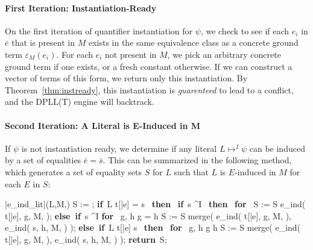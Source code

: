 \documentclass{llncs}
\def\IF{\qtab\keyword{if}\ }
\def\THEN{\ \keyword{then}\ }
\def\ELSEIF{\untab\qtab\keyword{else if}\ }
\def\FI{\untab}
\def\RETURN{\keyword{return}\ }
\def\ENDPROC{\untab}
\def\DOFOR{\qtab\keyword{for}\ }
\def\ENDFOR{\untab}
\def\keyword#1{\mbox{\normalshape\bf #1}}
\begin{document}
\begin{comment}
On the first iteration, we return the instantiation $\varepsilon_M( \bar{e} )$ if and only if $\psi$ is instantiation-ready.
On the second iteration, we determine if there exists a set of terms $\bar{s}$ such that we can determine that at least one of $L_1[\bar{e}] \ldots L_n[\bar{e}]$ is $(\bar{s} = \bar{e})$-induced in $M$.
On the third iteration, we will search for equality-ambiguous pairs of terms $t[\bar{e}]$ and $s$ in the same equivalence classes.  
Specifically, we will construct an instantiation $\bar{s}$ such that an equality between a subterm position of $t[\bar{e}]$ and $s$ is induced by $\bar{s} = \bar{e}$ on this step.
On the fourth iteration, we find a set of terms $\bar{s}$ that induce at least one equality between a pair of terms $t[\bar{e}]$ and $g$.
Note that this step is roughly equivalent to basic E-matching.
\end{comment}

\paragraph{First Iteration: Instantiation-Ready}

On the first iteration of quantifier instantiation for $\psi$, we check to see if each $e_i$ in $\bar{e}$ that is present in $M$ exists in the same equivalence class as a concrete ground term $\varepsilon_M(e_i)$.
For each $e_i$ not present in $M$, we pick an arbitrary concrete ground term if one exists, or a fresh constant otherwise.
If we can construct a vector of terms of this form, we return only this instantiation.
By Theorem~\ref{thm:instready}, this instantiation is \emph{guarenteed} to lead to a conflict, and the DPLL(T) engine will backtrack.

\paragraph{Second Iteration: A Literal is E-Induced in M}

If $\psi$ is not instantiation ready, we determine if any literal $L \mapsto^I \psi$ can be induced by a set of equalities $\bar{e} = \bar{s}$.
This can be summarized in the following method, which generates a set of equality sets $S$ for $L$ such that $L$ is $E$-induced in $M$ for each $E$ in $S$:

\begin{minipage}[t]{.4\linewidth}
\begin{program}
\PROC |e\_ind\_lit|(L,M,\psi) \BODY
  S := \emptyset;
  \IF L  t[\bar{e}] = s \THEN
    \IF s \mapsto^I \emptyset \THEN
      \DOFOR {} 
        S := S \cup e\_ind( t[\bar{e}], g, M, \psi );
      \ENDFOR
    \ELSEIF s \mapsto^I \psi
      \DOFOR {} g, h  g = h
        S := S \cup merge( e\_ind( t[\bar{e}], g, M, \psi ), e\_ind( s, h, M, \psi ) );
      \ENDFOR 
    \FI
  \ELSEIF L  t[\bar{e}] \neq s \THEN
    \DOFOR {} g, h  g \neq h
      S := S \cup merge( e\_ind( t[\bar{e}], g, M, \psi ), e\_ind( s, h, M, \psi ) );
    \ENDFOR
  \FI
  \RETURN S;
\ENDPROC
\end{program}
\end{minipage}
\end{document}
